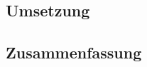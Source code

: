 \begin{spacing}{1}
\chapter{Umsetzung}\label{chapter:implementation}
\end{spacing}


\begin{spacing}{1}
\chapter{Zusammenfassung}
\end{spacing}


\newpage
{}
\setcounter{page}{\value{RPages}}

\glsnogroupskiptrue
\printglossary[title=Glossar,toctitle=Glossar] %
\listoffigures
\listoftables
\lstlistoflistings
\appendix
{}



